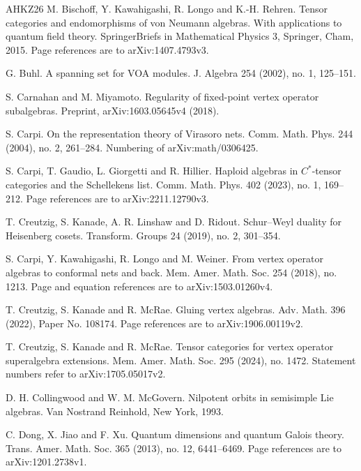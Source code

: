 \documentclass[leqno]{article}
\numberwithin{equation}{section}
\begin{document}
\begin{thebibliography}{AHKZ26}
M. Bischoff, Y. Kawahigashi, R. Longo and K.-H. Rehren.
\newblock Tensor categories and endomorphisms of von Neumann algebras. With applications to quantum field theory.
\newblock SpringerBriefs in Mathematical Physics 3, Springer, Cham, 2015. Page references are to arXiv:1407.4793v3.

G. Buhl.
\newblock A spanning set for VOA modules.
\newblock J. Algebra 254 (2002), no. 1, 125--151.

S. Carnahan and M. Miyamoto.
\newblock Regularity of fixed-point vertex operator subalgebras.
\newblock Preprint, arXiv:1603.05645v4 (2018).

S. Carpi.
\newblock On the representation theory of Virasoro nets.
\newblock Comm. Math. Phys. 244 (2004), no. 2, 261--284. Numbering of arXiv:math/0306425.

S. Carpi, T. Gaudio, L. Giorgetti and R. Hillier.
\newblock Haploid algebras in $C^*$-tensor categories and the Schellekens list.
\newblock Comm. Math. Phys. 402 (2023), no. 1, 169--212. Page references are to arXiv:2211.12790v3.

T. Creutzig, S. Kanade, A. R. Linshaw and D. Ridout.
\newblock Schur--Weyl duality for Heisenberg cosets.
\newblock Transform. Groups 24 (2019), no. 2, 301--354.

S. Carpi, Y. Kawahigashi, R. Longo and M. Weiner.
\newblock From vertex operator algebras to conformal nets and back.
\newblock Mem. Amer. Math. Soc. 254 (2018), no. 1213. Page and equation references are to arXiv:1503.01260v4.

T. Creutzig, S. Kanade and R. McRae.
\newblock Gluing vertex algebras.
\newblock Adv. Math. 396 (2022), Paper No. 108174. Page references are to arXiv:1906.00119v2.

T. Creutzig, S. Kanade and R. McRae.
\newblock Tensor categories for vertex operator superalgebra extensions.
\newblock Mem. Amer. Math. Soc. 295 (2024), no. 1472. Statement numbers refer to arXiv:1705.05017v2.

D. H. Collingwood and W. M. McGovern.
\newblock Nilpotent orbits in semisimple Lie algebras.
\newblock Van Nostrand Reinhold, New York, 1993.

C. Dong, X. Jiao and F. Xu.
\newblock Quantum dimensions and quantum Galois theory.
\newblock Trans. Amer. Math. Soc. 365 (2013), no. 12, 6441--6469. Page references are to arXiv:1201.2738v1.


\end{thebibliography}
\end{document}

